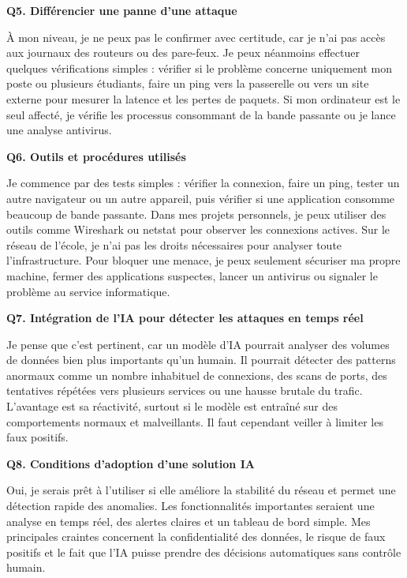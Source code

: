 \documentclass[12pt,a4paper]{article}
\begin{document}
\bigskip
\textbf{Q5. Diff\'{e}rencier une panne d'une attaque}

\`{A} mon niveau, je ne peux pas le confirmer avec certitude, car je n'ai pas acc\`{e}s aux journaux
des routeurs ou des pare-feux. Je peux n\'{e}anmoins effectuer quelques v\'{e}rifications simples :
v\'{e}rifier si le probl\`{e}me concerne uniquement mon poste ou plusieurs \'{e}tudiants, faire un ping
vers la passerelle ou vers un site externe pour mesurer la latence et les pertes de paquets. Si
mon ordinateur est le seul affect\'{e}, je v\'{e}rifie les processus consommant de la bande passante
ou je lance une analyse antivirus.

\bigskip
\textbf{Q6. Outils et proc\'{e}dures utilis\'{e}s}

Je commence par des tests simples : v\'{e}rifier la connexion, faire un ping, tester un autre
navigateur ou un autre appareil, puis v\'{e}rifier si une application consomme beaucoup de bande
passante. Dans mes projets personnels, je peux utiliser des outils comme Wireshark ou netstat
pour observer les connexions actives. Sur le r\'{e}seau de l'\'{e}cole, je n'ai pas les droits n\'{e}cessaires
pour analyser toute l'infrastructure. Pour bloquer une menace, je peux seulement s\'{e}curiser
ma propre machine, fermer des applications suspectes, lancer un antivirus ou signaler le
probl\`{e}me au service informatique.

\bigskip
\textbf{Q7. Int\'{e}gration de l'IA pour d\'{e}tecter les attaques en temps r\'{e}el}

Je pense que c'est pertinent, car un mod\`{e}le d'IA pourrait analyser des volumes de donn\'{e}es
bien plus importants qu'un humain. Il pourrait d\'{e}tecter des patterns anormaux comme un
nombre inhabituel de connexions, des scans de ports, des tentatives r\'{e}p\'{e}t\'{e}es vers plusieurs
services ou une hausse brutale du trafic. L'avantage est sa r\'{e}activit\'{e}, surtout si le mod\`{e}le est
entra\^{i}n\'{e} sur des comportements normaux et malveillants. Il faut cependant veiller \`{a} limiter les
faux positifs.

\bigskip
\textbf{Q8. Conditions d'adoption d'une solution IA}

Oui, je serais pr\^{e}t \`{a} l'utiliser si elle am\'{e}liore la stabilit\'{e} du r\'{e}seau et permet une d\'{e}tection
rapide des anomalies. Les fonctionnalit\'{e}s importantes seraient une analyse en temps r\'{e}el,
des alertes claires et un tableau de bord simple. Mes principales craintes concernent la
confidentialit\'{e} des donn\'{e}es, le risque de faux positifs et le fait que l'IA puisse prendre des
d\'{e}cisions automatiques sans contr\^{o}le humain.
\end{document}
